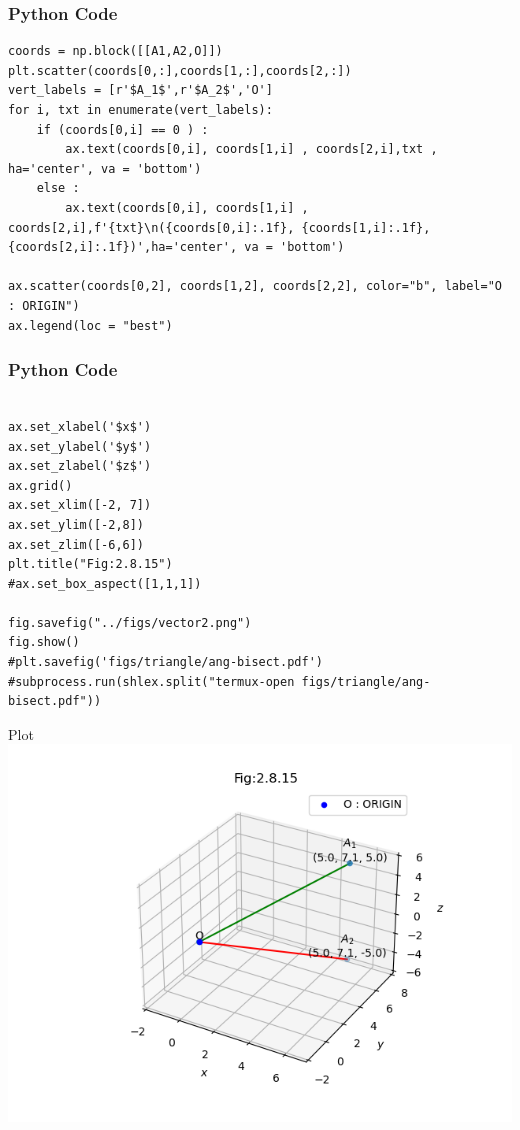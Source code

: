 \documentclass{beamer}
\begin{document}
\begin{frame}[fragile]
    \frametitle{Python Code }
    \begin{lstlisting}
coords = np.block([[A1,A2,O]])
plt.scatter(coords[0,:],coords[1,:],coords[2,:])
vert_labels = [r'$A_1$',r'$A_2$','O']
for i, txt in enumerate(vert_labels):
    if (coords[0,i] == 0 ) :
        ax.text(coords[0,i], coords[1,i] , coords[2,i],txt , ha='center', va = 'bottom')
    else :
        ax.text(coords[0,i], coords[1,i] , coords[2,i],f'{txt}\n({coords[0,i]:.1f}, {coords[1,i]:.1f}, {coords[2,i]:.1f})',ha='center', va = 'bottom')

ax.scatter(coords[0,2], coords[1,2], coords[2,2], color="b", label="O : ORIGIN")
ax.legend(loc = "best")
\end{lstlisting}
\end{frame}


\begin{frame}[fragile]
    \frametitle{Python Code }
    \begin{lstlisting}

ax.set_xlabel('$x$')
ax.set_ylabel('$y$')
ax.set_zlabel('$z$')
ax.grid()
ax.set_xlim([-2, 7])
ax.set_ylim([-2,8])
ax.set_zlim([-6,6])
plt.title("Fig:2.8.15")
#ax.set_box_aspect([1,1,1])

fig.savefig("../figs/vector2.png")
fig.show()
#plt.savefig('figs/triangle/ang-bisect.pdf')
#subprocess.run(shlex.split("termux-open figs/triangle/ang-bisect.pdf"))

    \end{lstlisting}
\end{frame}


\begin{frame}{Plot}
    \centering
    \includegraphics[width=\columnwidth, height=0.8\textheight, keepaspectratio]{figs/vector1.png}   
\end{frame}
\end{document}
